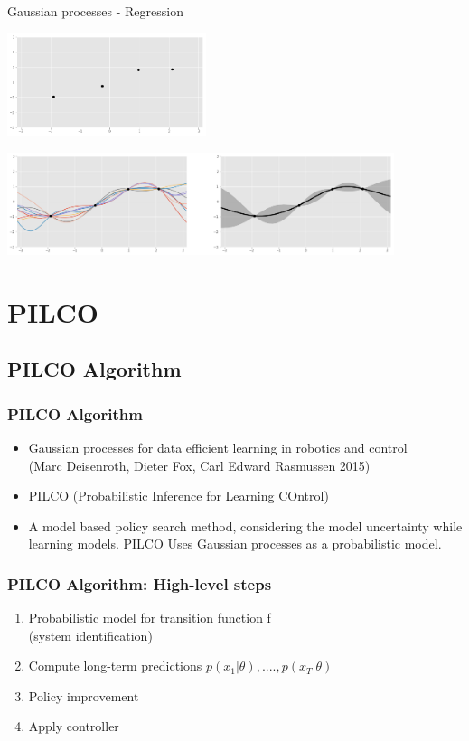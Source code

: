 \documentclass{beamer}
\begin{document}
\begin{frame}{Gaussian processes - Regression}
\begin{center}
    \includegraphics[height=3cm]{img/data.png}
    
    \includegraphics[height=3cm]{img/DPregression.png}
\end{center}
\end{frame}

\section{PILCO}

\subsection{PILCO Algorithm}

\begin{frame}
  \frametitle{PILCO Algorithm}
  \begin{itemize}
  \item Gaussian processes for data efficient learning in robotics and control\\
        (Marc Deisenroth, Dieter Fox, Carl Edward Rasmussen 2015)
  \item PILCO (Probabilistic Inference for Learning COntrol)
  \item A model based policy search method, considering the model uncertainty while learning models. PILCO Uses Gaussian processes as a probabilistic model.
  \end{itemize}
\end{frame}

\begin{frame}
\frametitle{PILCO Algorithm: High-level steps}
\begin{enumerate}
    \item Probabilistic model for transition function f \\
     (system identification)
    \item Compute long-term predictions $p(x_1|\theta),....,p(x_T|\theta)$
    \item Policy improvement
    \item Apply controller
\end{enumerate}
\end{frame}
\end{document}
